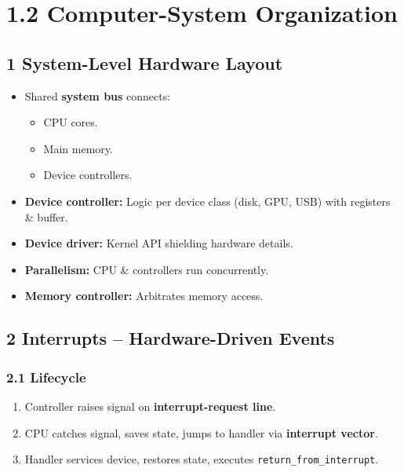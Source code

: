 \documentclass{article}
\begin{document}
\newpage
\section*{1.2 Computer-System Organization}
\subsection*{1 System-Level Hardware Layout}
\begin{itemize}
    \item Shared \textbf{system bus} connects:
    \begin{itemize}
        \item CPU cores.
        \item Main memory.
        \item Device controllers.
    \end{itemize}
    \item \textbf{Device controller:} Logic per device class (disk, GPU, USB) with registers \& buffer.
    \item \textbf{Device driver:} Kernel API shielding hardware details.
    \item \textbf{Parallelism:} CPU \& controllers run concurrently.
    \item \textbf{Memory controller:} Arbitrates memory access.
\end{itemize}

\subsection*{2 Interrupts – Hardware-Driven Events}
\subsubsection*{2.1 Lifecycle}
\begin{enumerate}[label=\arabic*.]
    \item Controller raises signal on \textbf{interrupt-request line}.
    \item CPU catches signal, saves state, jumps to handler via \textbf{interrupt vector}.
    \item Handler services device, restores state, executes \texttt{return\_from\_interrupt}.
\end{enumerate}
\end{document}
